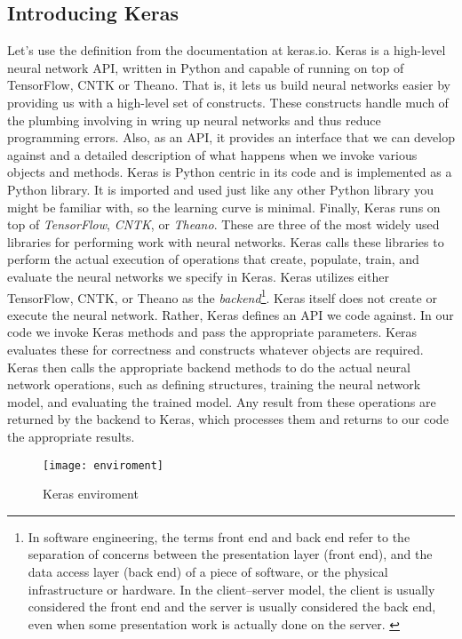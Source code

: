 \subsection{Introducing Keras}
\label{sec:introduction_keras}
Let's use the definition from the documentation at keras.io.
Keras is a high-level neural network API, written in Python and capable of
running on top of TensorFlow, CNTK or Theano.\cite{chollet2015keras}
That is, it lets us build neural networks easier by providing us with a
high-level set of constructs.
These constructs handle much of the plumbing involving in wring up neural
networks and thus reduce programming errors.
Also, as an API, it provides an interface that we can develop against and a
detailed description of what happens when we invoke various objects and methods.
Keras is Python centric in its code and is implemented as a Python library.
It is imported and used just like any other Python library you might be familiar
with, so the learning curve is minimal.
Finally, Keras runs on top of \emph{TensorFlow}, \emph{CNTK}, or \emph{Theano}.
These are three of the most widely used libraries for performing work with
neural networks.
Keras calls these libraries to perform the actual execution of operations that
create, populate, train, and evaluate the neural networks we specify in Keras.
Keras utilizes either TensorFlow, CNTK, or Theano as the 
\emph{backend}\footnote{In software engineering, the terms front end and back 
end refer to the separation of concerns between the presentation layer (front 
end), and the data access layer (back end) of a piece of software, or the 
physical infrastructure or hardware. In the client--server model, the client 
is usually considered the front end and the server is usually considered the 
back end, even when some presentation work is actually done on the server.
\cite{backend}}.
Keras itself does not create or execute the neural network.
Rather, Keras defines an API we code against. 
In our code we invoke Keras methods and pass the appropriate parameters.
Keras evaluates these for correctness and constructs whatever objects are
required.
Keras then calls the appropriate backend methods to do the actual neural 
network operations, such as defining structures, training the neural network 
model, and evaluating the trained model. Any result from these operations are 
returned by the backend to Keras, which processes them and returns to our code 
the appropriate results.
%
\begin{figure}[!h]
\centering
\texttt{[image: enviroment]}
\caption{Keras enviroment}
\label{fig:nn_layer}
\end{figure}
%
